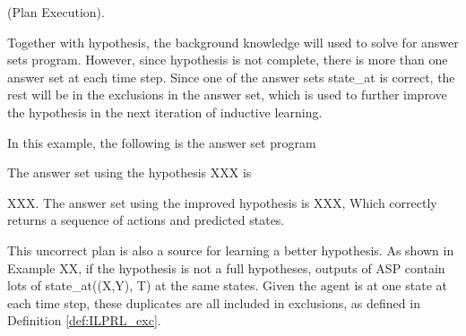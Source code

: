 \begin{examp} \normalfont (Plan Execution).

Together with hypothesis, the background knowledge will used to solve for answer sets program. 
However, since hypothesis is not complete, there is more than one answer set at each time step. 
Since one of the answer sets state\_at is correct, the rest will be in the exclusions in the answer set, 
which is used to further improve the hypothesis in the next iteration of inductive learning.

In this example, the following is the answer set program

The answer set using the hypothesis XXX is 

XXX. 
The answer set using the improved hypothesis is XXX, 
Which correctly returns a sequence of actions and predicted states. 

\end{examp}

This uncorrect plan is also a source for learning a better hypothesis. 
As shown in Example XX, if the hypothesis is not a full hypotheses, outputs of ASP contain lots of \textsf{state\_at((X,Y), T)} at the same states. 
Given the agent is at one state at each time step, these duplicates are all included in exclusions, as defined in Definition \ref{def:ILPRL_exc}.


